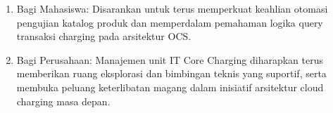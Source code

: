 \documentclass[12pt,a4paper]{article}
\begin{document}
\vspace{0.4cm}
\vspace{0.2cm}
\begin{enumerate}[label=\arabic*.,leftmargin=1.5em,itemsep=2pt,topsep=2pt]
    \item Bagi Mahasiswa: Disarankan untuk terus memperkuat keahlian otomasi pengujian katalog produk dan memperdalam pemahaman logika query transaksi charging pada arsitektur OCS.
    \item Bagi Perusahaan: Manajemen unit IT Core Charging diharapkan terus memberikan ruang eksplorasi dan bimbingan teknis yang suportif, serta membuka peluang keterlibatan magang dalam inisiatif arsitektur cloud charging masa depan.
\end{enumerate}
\end{document}

